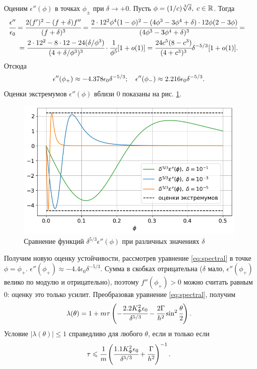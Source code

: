 Оценим $\epsilon''(\phi)$ в точках $\phi_{\pm}$ при $\delta \to +0$. Пусть $\phi = (1 / c) \sqrt[3]{\delta}, \; c \in {\mathbb{R}}$. Тогда
\begin{multline*}
	\hspace{-2mm}
	\cfrac{\epsilon''}{\epsilon_0} = \cfrac{2(f')^2 - (f + \delta)f''}{(f + \delta)^3} = \cfrac{2 \cdot 12^2 \phi^4 (1 - \phi)^2 - (4 \phi^3 - 3 \phi^4 + \delta) \cdot 12 \phi (2 - 3 \phi)}{(4 \phi^3 - 3 \phi^4 + \delta)^3} = \\ = \cfrac{2 \cdot 12^2 - 8 \cdot 12 - 24 (\delta / \phi^3)}{(4 + \delta / \phi^3)^3} \cdot \cfrac{1}{\phi^5}[1 + o(1)] = \cfrac{24 c^5 (8 - c^3)}{(4 + c^3)^3} \delta^{-5 / 3} [1 + o(1)] \tpoint
\end{multline*}
Отсюда
$$\epsilon''(\phi_+) \approx -4.378 \epsilon_0 \delta^{-5 / 3}; \quad \epsilon''(\phi_-) \approx 2.216 \epsilon_0 \delta^{-5 / 3} {\text{.}}$$
Оценки экстремумов $\epsilon''(\phi)$ вблизи $0$ показаны на рис. \ref{fig:eps_phi_phi_multiplied}.

\begin{figure}[!t]
	\centering
	\includegraphics[width=\textwidth]{figures/eps_phi_phi_multiplied.png}
	\caption{Сравнение функций $\delta^{5 / 3} \epsilon''(\phi)$ при различных значениях $\delta$}
	\label{fig:eps_phi_phi_multiplied}
\end{figure}

Получим новую оценку устойчивости, рассмотрев уравнение \eqref{eq:spectral} в точке $\phi = \phi_+$. $\epsilon''(\phi_+) \approx -4.4 \epsilon_0 \delta^{-5 / 3}$. Сумма в скобках отрицательна ($\delta$ мало, $\epsilon''(\phi_+)$ велико по модулю и отрицательно), поэтому $f''(\phi_+) > 0$ можно считать равным $0$: оценку это только усилит. Преобразовав уравнение \eqref{eq:spectral}, получим
$$\lambda(\theta) = 1 + m \tau \left( -\cfrac{2.2 K_\Phi^2 \epsilon_0}{\delta^{5 / 3}} - \cfrac{2 \Gamma}{h^2} \sin^2 \cfrac{\theta}{2} \right) {\text{.}}$$
Условие $|\lambda(\theta)| \leqslant 1$ справедливо для любого $\theta$, если и только если
\begin{equation}
	\tau \leqslant \cfrac{1}{m} \left( \cfrac{1.1 K_\Phi^2 \epsilon_0}{\delta^{5 / 3}} + \cfrac{\Gamma}{h^2} \right)^{-1} {\text{.}}
	\label{cond:spectral_better_theoretical}
\end{equation}

